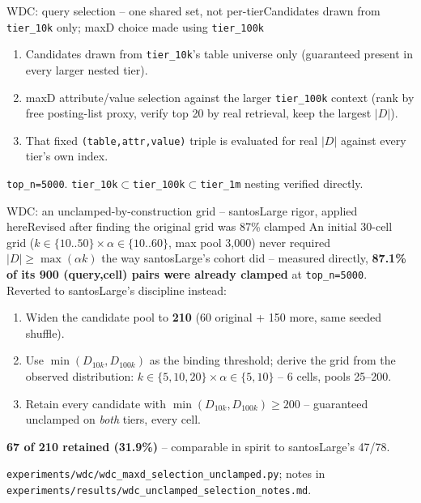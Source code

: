 \documentclass[aspectratio=169,10pt]{beamer}
\newcommand{\highlight}[1]{{\color{Cat1}\bfseries #1}}
\begin{document}
\begin{frame}{WDC: query selection -- one shared set, not per-tier}{Candidates drawn from \texttt{tier\_10k} only; maxD choice made using \texttt{tier\_100k}}
\small
\begin{enumerate}
  \item Candidates drawn from \texttt{tier\_10k}'s table universe only (guaranteed present in every larger nested tier).
  \item maxD attribute/value selection against the larger \texttt{tier\_100k} context (rank by free posting-list proxy, verify top 20 by real retrieval, keep the largest $|D|$).
  \item That fixed \texttt{(table,attr,value)} triple is evaluated for real $|D|$ against every tier's own index.
\end{enumerate}
\vspace{4pt}
{\footnotesize\color{Muted} \texttt{top\_n=5000}. \texttt{tier\_10k}$\subset$\texttt{tier\_100k}$\subset$\texttt{tier\_1m} nesting verified directly.}
\end{frame}

\begin{frame}{WDC: an unclamped-by-construction grid -- santosLarge rigor, applied here}{Revised after finding the original grid was 87\% clamped}
\small
An initial 30-cell grid ($k\in\{10..50\}\times\alpha\in\{10..60\}$, max pool 3{,}000) never required $|D|\geq\max(\alpha k)$ the way santosLarge's cohort did -- measured directly, \highlight{87.1\% of its 900 (query,cell) pairs were already clamped} at \texttt{top\_n=5000}. Reverted to santosLarge's discipline instead:

\vspace{4pt}
\begin{enumerate}
  \item Widen the candidate pool to \highlight{210} (60 original + 150 more, same seeded shuffle).
  \item Use $\min(D_{10k},D_{100k})$ as the binding threshold; derive the grid from the observed distribution: $k\in\{5,10,20\}\times\alpha\in\{5,10\}$ -- 6 cells, pools 25--200.
  \item Retain every candidate with $\min(D_{10k},D_{100k})\geq 200$ -- guaranteed unclamped on \emph{both} tiers, every cell.
\end{enumerate}
\vspace{4pt}
\highlight{67 of 210 retained (31.9\%)} -- comparable in spirit to santosLarge's 47/78.

{\footnotesize\color{Muted} \texttt{experiments/wdc/wdc\_maxd\_selection\_unclamped.py}; notes in \texttt{experiments/results/wdc\_unclamped\_selection\_notes.md}.}
\end{frame}
\end{document}
